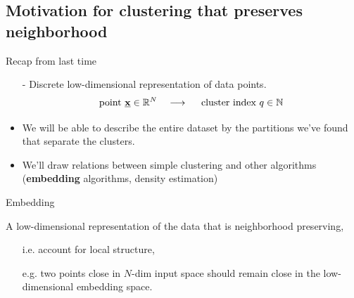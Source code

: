 \subsection{Motivation for clustering that preserves neighborhood}

\begin{frame}{\subsecname}

Recap from last time\\

 
\begin{itemize}
\item[-] Discrete low-dimensional representation of data points.
\begin{equation}
\text{point}~\underline{\mathbf{x}} \in \mathbb{R}^N \quad \longrightarrow \quad~\text{cluster index}~q \in \mathbb{N}
\end{equation} 
\item We will be able to describe the entire dataset by the partitions we've found that separate the clusters.
\item We'll draw relations between simple clustering and other algorithms (\textbf{embedding} algorithms, density estimation)
\end{itemize}

\end{frame}

\begin{frame}

\begin{block}{Embedding}

A low-dimensional representation of the data that is neighborhood preserving,
\begin{itemize}
\item[i.e.] account for local structure,
\item[e.g.] two points close in $N$-dim input space should remain close in the low-dimensional embedding space.
\end{itemize}

\end{block}

\end{frame}


